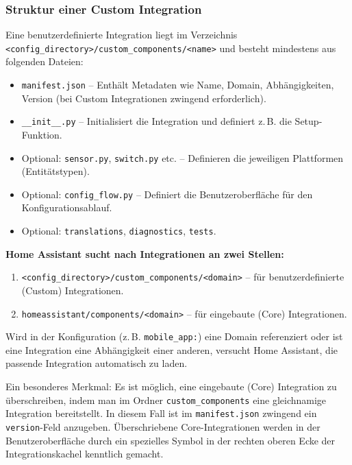 \subsubsection{Struktur einer Custom Integration}

Eine benutzerdefinierte Integration liegt im Verzeichnis \\
\texttt{<config\_directory>/custom\_components/<name>} und besteht mindestens aus folgenden Dateien:

\begin{itemize}
    \item \texttt{manifest.json} – Enthält Metadaten wie Name, Domain, Abhängigkeiten, Version (bei Custom Integrationen zwingend erforderlich).\\
    \item \texttt{\_\_init\_\_.py} – Initialisiert die Integration und definiert z.\,B. die Setup-Funktion.\\
    \item Optional: \texttt{sensor.py}, \texttt{switch.py} etc. – Definieren die jeweiligen Plattformen (Entitätstypen).\\
    \item Optional: \texttt{config\_flow.py} – Definiert die Benutzeroberfläche für den Konfigurationsablauf.\\
    \item Optional: \texttt{translations}, \texttt{diagnostics}, \texttt{tests}.
\end{itemize}

\textbf{Home Assistant sucht nach Integrationen an zwei Stellen:}

\begin{enumerate}
    \item \texttt{<config\_directory>/custom\_components/<domain>} – für benutzerdefinierte (Custom) Integrationen.\\
    \item \texttt{homeassistant/components/<domain>} – für eingebaute (Core) Integrationen.
\end{enumerate}

Wird in der Konfiguration (z.\,B. \texttt{mobile\_app:}) eine Domain referenziert oder ist eine Integration eine Abhängigkeit einer anderen, versucht Home Assistant, die passende Integration automatisch zu laden. 

Ein besonderes Merkmal: Es ist möglich, eine eingebaute (Core) Integration zu überschreiben, indem man im Ordner \texttt{custom\_components} eine gleichnamige Integration bereitstellt. In diesem Fall ist im \texttt{manifest.json} zwingend ein \texttt{version}-Feld anzugeben. Überschriebene Core-Integrationen werden in der Benutzeroberfläche durch ein spezielles Symbol in der rechten oberen Ecke der Integrationskachel kenntlich gemacht.


